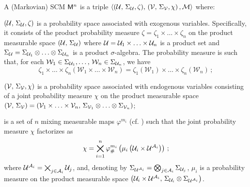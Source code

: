 \begin{definition}\label{def:SCM_prob}
    A (Markovian) SCM $\mathsf{M}^n$ is a triple $\langle (\mathcal{U},\, \Sigma_{\mathcal{U}}, \zeta), \, (\mathcal{V},\, \Sigma_{\mathcal{V}}, \chi)\, , \mathcal{M} \rangle$  where:
    \begin{squishlist}
        \item $(\mathcal{U},\, \Sigma_{\mathcal{U}}, \zeta)$ is a probability space associated with exogenous variables. Specifically, it consists of the product probability measure $\zeta=\zeta_1 \times \ldots \times \zeta_n$ on the product measurable space $(\mathcal{U},\, \Sigma_{\mathcal{U}})$ where $\mathcal{U} = \mathcal{U}_1 \times \ldots \times \mathcal{U}_n$ is a product set and $ \Sigma_{\mathcal{U}} =  \Sigma_{\mathcal{U}_1} \otimes \ldots \otimes \Sigma_{\mathcal{U}_n}$ is a product $\sigma$-algebra.
        The probability measure is such that, for each $\mathcal{W}_1 \in \Sigma_{\mathcal{U}_1}, \ldots, \, \mathcal{W}_n \in \Sigma_{\mathcal{U}_n}$, we have 
        \begin{equation}
            \zeta_1 \times \ldots \times \zeta_n (\mathcal{W}_1 \times \ldots \times \mathcal{W}_n)=\zeta_1(\mathcal{W}_1) \times \ldots \times \zeta_n(\mathcal{W}_n)\,;
        \end{equation}
        \item $(\mathcal{V},\, \Sigma_{\mathcal{V}}, \chi)$ is a probability space associated with endogenous variables consisting of a joint probability measure $\chi$ on the product measurable space $(\mathcal{V},\, \Sigma_{\mathcal{V}})=(\mathcal{V}_1 \times \ldots \times \mathcal{V}_n,\, \Sigma_{\mathcal{V}_1} \otimes \ldots \otimes \Sigma_{\mathcal{V}_n})$;
        \item \mymixing is a set of $n$ mixing measurable maps $\varphi^{m_i}$ (cf. ) such that the joint probability measure $\chi$ factorizes as 
        \begin{equation}
            \chi = \bigtimes_{i=1}^n \varphi^{m_i}_{\#}\left(\mu_i \left( \mathcal{U}_i \times \mathcal{U}^{\mathcal{A}_i} \right) \right)\,;       
        \end{equation}
        where $\mathcal{U}^{\mathcal{A}_i}=\bigtimes_{j \in \mathcal{A}_i} \mathcal{U}_j$, and, denoting by $\Sigma_{\mathcal{U}^{\mathcal{A}_i}}=\bigotimes_{j \in \mathcal{A}_i} \Sigma_{\mathcal{U}_j}$, $\mu_i$ is a probability measure on the product measurable space $\left( \mathcal{U}_i \times \mathcal{U}^{\mathcal{A}_i},\, \Sigma_{\mathcal{U}_i} \otimes \Sigma_{\mathcal{U}^{\mathcal{A}_i}} \right)$.
    \end{squishlist}
\end{definition}